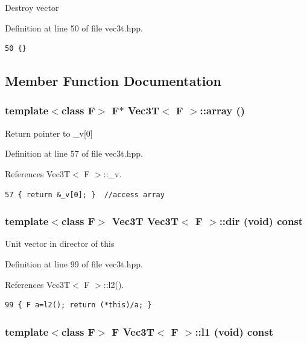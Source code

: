 Destroy vector 

Definition at line 50 of file vec3t.hpp.

\footnotesize\begin{verbatim}50 {}
\end{verbatim}\normalsize 




\subsection{Member Function Documentation}
\subsubsection{\setlength{\rightskip}{0pt plus 5cm}template$<$class F$>$ F$\ast$ {\bf Vec3T}$<$ F $>$::array ()\hspace{0.3cm}{\tt  [inline]}}\label{classVec3T_fed1d2aa4ab9cd28dd771492a3bc2f97_fed1d2aa4ab9cd28dd771492a3bc2f97}


Return pointer to \_\-v[0] 

Definition at line 57 of file vec3t.hpp.

References Vec3T$<$ F $>$::\_\-v.

\footnotesize\begin{verbatim}57 { return &_v[0]; }  //access array
\end{verbatim}\normalsize 


\subsubsection{\setlength{\rightskip}{0pt plus 5cm}template$<$class F$>$ {\bf Vec3T} {\bf Vec3T}$<$ F $>$::dir (void) const\hspace{0.3cm}{\tt  [inline]}}\label{classVec3T_a74553621910e03016573bb3cd7a3e7c_a74553621910e03016573bb3cd7a3e7c}


Unit vector in director of this 

Definition at line 99 of file vec3t.hpp.

References Vec3T$<$ F $>$::l2().

\footnotesize\begin{verbatim}99 { F a=l2(); return (*this)/a; }
\end{verbatim}\normalsize 


\subsubsection{\setlength{\rightskip}{0pt plus 5cm}template$<$class F$>$ F {\bf Vec3T}$<$ F $>$::l1 (void) const\hspace{0.3cm}{\tt  [inline]}}\label{classVec3T_d6b8e40dbcfd9fe5c2375fe82598b02d_d6b8e40dbcfd9fe5c2375fe82598b02d}



